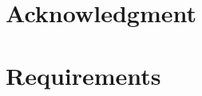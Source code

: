 \documentclass[12pt]{article}
\begin{document}
		
\FloatBarrier
\newpage

\section{Acknowledgment}
	
	
\FloatBarrier
\newpage
\appendix
\section{Requirements} \label{app:requirements}



\newpage
\end{document}
